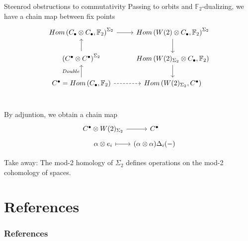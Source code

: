 \documentclass[10pt,t]{beamer}
\newcommand{\F}{\mathbb F}
\begin{document}
\begin{frame}[fragile]{Steenrod obstructions to commutativity}
	Passing to orbits and $\F_2$-dualizing, we have a chain map between fix points
	\begin{equation*}
	\begin{tikzcd}
	Hom\left(C_\bullet \otimes C_\bullet, \F_2 \right)^{\Sigma_2} \arrow[r] &
	Hom\left(W(2) \otimes C_\bullet, \F_2 \right)^{\Sigma_2} \arrow[d] \\
	\left(C^\bullet \otimes C^\bullet\right)^{\Sigma_2} \arrow[u]&
	Hom\left(W(2)_{\Sigma_2} \otimes C_\bullet, \F_2 \right) \arrow[d] \\
	C^\bullet = Hom\left(C_\bullet, \F_2 \right) \arrow[u, "Double"] \arrow[r, dashed]&
	Hom\left(W(2)_{\Sigma_2}, C^\bullet\right) \\
	\end{tikzcd}
	\end{equation*}
	
	\vspace*{-22pt}\pause
	
	By adjuntion, we obtain a chain map
	\vspace*{-5pt}
	\begin{equation*}
	\begin{tikzcd}[row sep=tiny, column sep = tiny]
	C^\bullet \otimes W(2)_{\Sigma_2} \arrow[r] & C^\bullet \\
	\alpha \otimes e_i \arrow[r, |->] & (\alpha \otimes \alpha)\Delta_i(-)
	\end{tikzcd}
	\end{equation*}
	
	\vspace*{-5pt}\pause
	
	\textcolor{pblue}{Take away:} The mod-2 homology of $\Sigma_2$ defines operations on the mod-2 cohomology of spaces.
\end{frame}

\section*{References}

\begin{frame}%
	\frametitle{References}
	\nocite{whitney1935history}
	
	
\end{frame}
\end{document}
